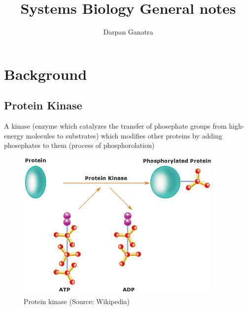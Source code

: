 \documentclass[11pt]{article}
\author{Darpan Ganatra}
\date{}
\title{Systems Biology General notes}
\begin{document}
\maketitle

\section{Background}
\label{sec:orgb20e9b8}
\subsection{Protein Kinase}
\label{sec:org9bb2383}
A kinase (enzyme which catalyzes the transfer of phosephate groups from high-energy molecules to substrates) which modifies other proteins by adding phosephates to them (process of phosphorolation)
\begin{figure}[htbp]
\centering
\includegraphics[width=.9\linewidth]{./Ch4_kinases.jpg}
\caption{Protein kinase (Source: Wikipedia)}
\end{figure}
\end{document}
